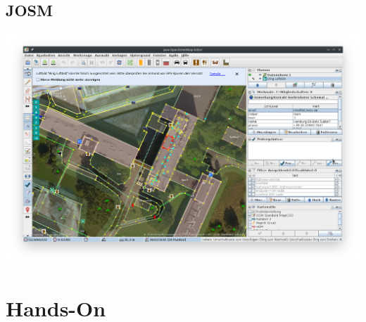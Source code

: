 \documentclass{beamer}
\begin{document}
	\subsection{JOSM}
	
	\begin{frame}
		\begin{center}
			\includegraphics[width=\linewidth,height=\textheight,keepaspectratio]{images/josm-editor}
		\end{center}
	\end{frame}
	
	\section{Hands-On}
	
\end{document}
